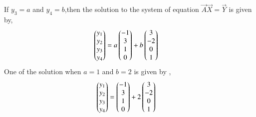 \documentclass[journal,12pt,twocolumn]{IEEEtran}
\begin{document}
If $y_3=a$ and $y_4=b$,then the solution to the system of equation $\vec{A}\vec{X}=\vec{Y}$ is given by,
\begin{align}
    \begin{pmatrix}y_1\\y_2\\y_3\\y_4\end{pmatrix}&=a\begin{pmatrix}-1\\3\\1\\0\end{pmatrix}+b\begin{pmatrix}3\\-2\\0\\1\end{pmatrix}
\end{align}
One of the solution when $a=1$ and $b=2$  is given by , 
\begin{align}
    \begin{pmatrix}y_1\\y_2\\y_3\\y_4\end{pmatrix}&=\begin{pmatrix}-1\\3\\1\\0\end{pmatrix}+2\begin{pmatrix}3\\-2\\0\\1\end{pmatrix}
\end{align}
\end{document}
